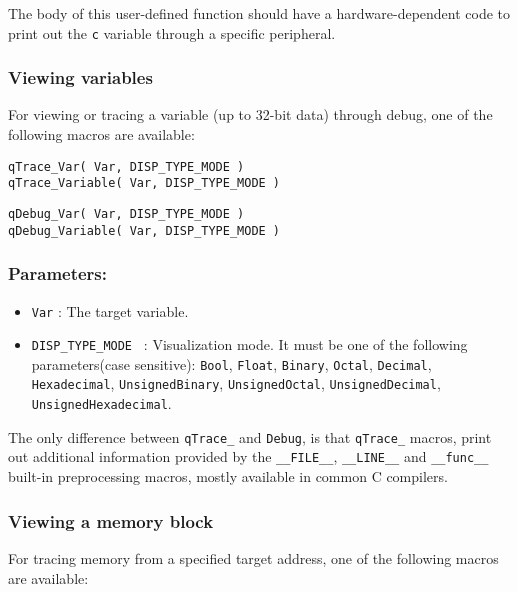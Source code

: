 The body of this user-defined function should have a hardware-dependent code to print out the \lstinline{c} variable through a specific peripheral.

\subsubsection{Viewing variables}
For viewing or tracing a variable (up to 32-bit data) through debug, one of the following macros are available:
   
\medskip

\begin{lstlisting}[style=CStyle]
qTrace_Var( Var, DISP_TYPE_MODE )
qTrace_Variable( Var, DISP_TYPE_MODE )
\end{lstlisting}
\begin{lstlisting}[style=CStyle]
qDebug_Var( Var, DISP_TYPE_MODE )
qDebug_Variable( Var, DISP_TYPE_MODE )
\end{lstlisting}

\subsubsection*{Parameters:}
\begin{itemize}
    \item \lstinline{Var} : The target variable. 
    \item \lstinline{DISP_TYPE_MODE } :  Visualization mode. It must be one of the following parameters(case sensitive): \lstinline{Bool}, \lstinline{Float}, \lstinline{Binary}, \lstinline{Octal}, \lstinline{Decimal}, \lstinline{Hexadecimal}, \lstinline{UnsignedBinary}, \lstinline{UnsignedOctal}, \lstinline{UnsignedDecimal}, \lstinline{UnsignedHexadecimal}. 
\end{itemize}

The only difference between \lstinline{qTrace_} and  \lstinline{Debug}, is that \lstinline{qTrace_} macros, print out additional information provided by the \lstinline{__FILE__}, \lstinline{__LINE__} and \lstinline{__func__} built-in preprocessing macros, mostly available in common C compilers. 

\subsubsection{Viewing a memory block}
For tracing memory from a specified target address, one of the following macros are available:  


